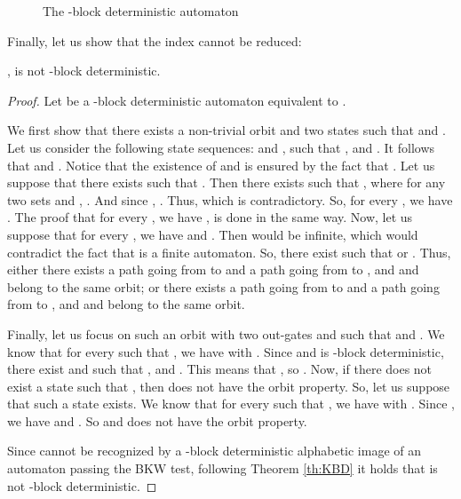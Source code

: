 \documentclass{llncs}
\begin{document}
\begin{figure}[H]
	\centering
	
	
	\caption{The -block deterministic automaton }
	\label{fg:bk}
\end{figure}		

Finally, let us show that the index cannot be reduced:

\begin{proposition}
	,  is not -block deterministic.
\end{proposition}
\begin{proof}
	Let  be a -block deterministic automaton equivalent to .
	
	We first show that there exists a non-trivial orbit  and two states  such that  and .
	Let us consider the following state sequences:  and , such that ,  and .
	It follows that  and .
	Notice that the existence of  and  is ensured by the fact that .
	Let us suppose that there exists  such that .
	Then there exists  such that , where for any two sets  and , .
	And since , .
	Thus,  which is contradictory.
	So, for every , we have .
	The proof that for every , we have , is done in the same way.
	Now, let us suppose that for every , we have  and .
	Then  would be infinite, which would contradict the fact that  is a finite automaton.
	So, there exist  such that  or .
	Thus, either there exists a path going from  to  and a path going from  to , and  and  belong to the same orbit; or there exists a path going from  to  and a path going from  to , and  and  belong to the same orbit.
	
	Finally, let us focus on such an orbit  with two out-gates  and  such that  and .
	We know that for every  such that , we have  with .
	Since  and  is -block deterministic, there exist  and  such that ,  and .
	This means that , so .
	Now, if there does not exist a state  such that , then  does not have the orbit property.
	So, let us suppose that such a state exists.
	We know that for every  such that , we have  with .
	Since , we have  and .
	So  and  does not have the orbit property.
	
	Since  cannot be recognized by a -block deterministic alphabetic image of an automaton passing the BKW test, following Theorem \ref{th:KBD} it holds that  is not -block deterministic.
\end{proof}
\end{document}
